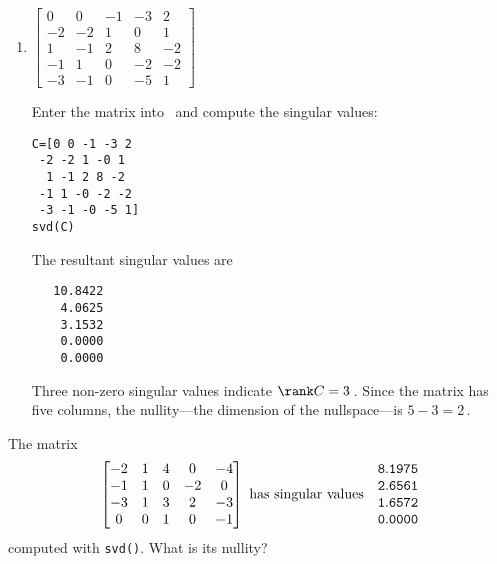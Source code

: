 \begin{example}
\begin{enumerate}
\item \(\begin{bmatrix} 0&0&-1&-3&2
\\-2&-2&1&0&1
\\1&-1&2&8&-2
\\-1&1&0&-2&-2
\\-3&-1&0&-5&1 \end{bmatrix}\)
\begin{solution} 
Enter the matrix into \script\ and compute the singular values:
\begin{verbatim}
C=[0 0 -1 -3 2
 -2 -2 1 -0 1
  1 -1 2 8 -2
 -1 1 -0 -2 -2
 -3 -1 -0 -5 1]
svd(C)
\end{verbatim}
\setbox\ajrqrbox\hbox{}%
\marginpar{\usebox{\ajrqrbox}}%
The resultant singular values are
\begin{verbatim}
   10.8422
    4.0625
    3.1532
    0.0000
    0.0000
\end{verbatim}
Three non-zero singular values indicate \(\rank C=3\)\,.
Since the matrix has five columns, the nullity---the dimension of the nullspace---is \(5-3=2\)\,. 
\end{solution}


\end{enumerate}
\end{example}



\begin{activity}
The matrix
\begin{equation*}
\begin{bmatrix} -2&1&4&0&-4
\\-1&1&0&-2&0
\\-3&1&3&2&-3
\\0&0&1&0&-1 \end{bmatrix}
\text{ has singular values}\quad
\begin{matrix}\tt 8.1975
\\\tt 2.6561
\\\tt 1.6572
\\\tt 0.0000 \end{matrix}
\end{equation*}
computed with \verb|svd()|.
What is its nullity?
\end{activity}





